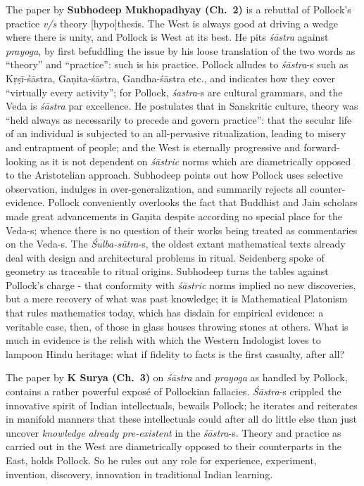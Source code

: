 The paper by {\bf Subhodeep Mukhopadhyay (Ch.~2)} is a rebuttal of Pollock’s practice {\sl v/s} theory [hypo]thesis. The West is always good at driving a wedge where there is unity, and Pollock is West at its best. He pits {\sl śāstra} against  {\sl prayoga}, by first befuddling the issue by his loose translation of the two words as “theory” and “practice”: such is his practice. Pollock alludes to {\sl śāstra}-s such as Kṛṣī-śāstra, Gaṇita-śāstra, Gandha-śāstra etc., and indicates how they cover “virtually every activity”; for Pollock, {\sl śastra}-s are cultural grammars, and the Veda is {\sl śāstra} par excellence. He postulates that in Sanskritic culture, theory was “held always as necessarily to precede and govern practice'': that the secular life of an individual is subjected to an all-pervasive ritualization, leading to misery and entrapment of people; and the West is eternally progressive and forward-looking as it is not dependent on {\sl śāstric} norms which are diametrically opposed to the Aristotelian approach. Subhodeep points out how Pollock uses selective observation, indulges in over-generalization, and summarily rejects all counter-evidence. Pollock conveniently overlooks the fact that Buddhist and Jain scholars made great advancements in Gaṇita despite according no special place for the Veda-s; whence there is no question of their works being treated as commentaries on the \hbox{Veda-s}. The {\sl Śulba-sūtra}-s, the oldest extant mathematical texts already deal with design and architectural problems in ritual. Seidenberg spoke of geometry as traceable to ritual origins. Subhodeep turns the tables against Pollock’s charge - that conformity with {\sl śāstric} norms implied no new discoveries, but a mere recovery of what was past knowledge; it is Mathematical Platonism that rules mathematics today, which has disdain for empirical evidence: a veritable case, then, of those in glass houses throwing stones at others. What is much in evidence is the relish with which the Western Indologist loves to lampoon Hindu heritage: what if fidelity to facts is the first casualty, after all?
\vskip 8pt

The paper by {\bf K Surya (Ch.~3)} on {\sl śāstra} and {\sl prayoga} as handled by Pollock, contains a rather powerful exposé of Pollockian fallacies. {\sl Śāstra}-s crippled the innovative spirit of Indian intellectuals, bewails Pollock; he iterates and reiterates in manifold manners that these intellectuals could after all do little else than just uncover {\sl knowledge already pre-existent} in the {\sl śāstra}-s. Theory and practice as carried out in the West are diametrically opposed to their counterparts in the East, holds Pollock. So he rules out any role for experience, experiment, invention, discovery, innovation in traditional Indian learning.
\vskip 3pt

